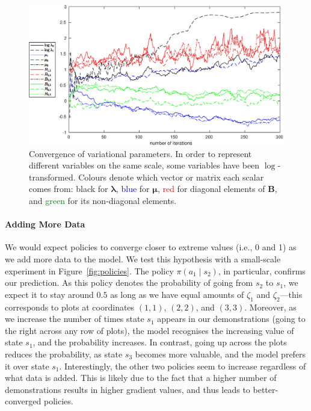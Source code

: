 \documentclass{mpaper}
\newcommand{\pitwo}{\pi(a_1 \mid s_2)}
\begin{document}
\begin{figure}
  \centering
  \includegraphics[width=\textwidth]{figures/parameter_convergence_new}
  \caption{Convergence of variational parameters. In order to represent
    different variables on the same scale, some variables have been
    $\log$-transformed. Colours denote which vector or matrix each scalar comes
    from: black for $\bm\lambda$, \textcolor{blue}{blue} for $\bm\mu$,
    \textcolor{red}{red} for diagonal elements of $\mathbf{B}$, and
    \textcolor{green}{green} for its non-diagonal elements.}
  \label{fig:convergence2}
\end{figure}

\paragraph{Adding More Data}

We would expect policies to converge closer to extreme values (i.e., 0 and 1) as
we add more data to the model. We test this hypothesis with a small-scale
experiment in Figure~\ref{fig:policies}. The policy $\pitwo$, in particular,
confirms our prediction. As this policy denotes the probability of going from
$s_2$ to $s_1$, we expect it to stay around $0.5$ as long as we have equal
amounts of $\zeta_1$ and $\zeta_2$---this corresponds to plots at coordinates
$(1, 1)$, $(2, 2)$, and $(3, 3)$. Moreover, as we increase the number of times
state $s_1$ appears in our demonstrations (going to the right across any row of
plots), the model recognises the increasing value of state $s_1$, and the
probability increases. In contrast, going up across the plots reduces the
probability, as state $s_3$ becomes more valuable, and the model prefers it over
state $s_1$. Interestingly, the other two policies seem to increase regardless
of what data is added. This is likely due to the fact that a higher number of
demonstrations results in higher gradient values, and thus leads to
better-converged policies.
\end{document}
